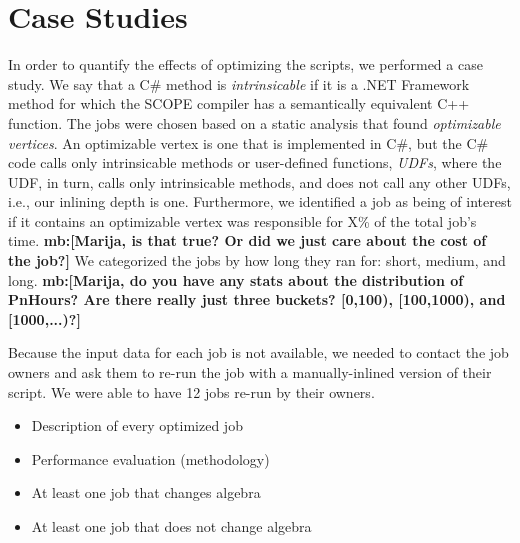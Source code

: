 \section{Case Studies}
In order to quantify the effects of optimizing the scripts, we performed a case study.
We say that a C\# method is {\em intrinsicable} if it is a .NET Framework method for which the SCOPE compiler has a semantically equivalent C++ function.
The jobs were chosen based on a static analysis that found {\em optimizable vertices}.
An optimizable vertex is one that is implemented in C\#, but the C\# code calls only intrinsicable methods or user-defined functions, {\em UDFs}, where the UDF, in turn, calls only intrinsicable methods, and does not call any other UDFs, i.e., our inlining depth is one.
Furthermore, we identified a job as being of interest if it contains an optimizable vertex was responsible for X\% of the total job's time.
{\bf mb:[Marija, is that true? Or did we just care about the cost of the job?]}
We categorized the jobs by how long they ran for: short, medium, and long.
{\bf mb:[Marija, do you have any stats about the distribution of PnHours? Are there really just three buckets? [0,100), [100,1000), and [1000,...)?]}

Because the input data for each job is not available, we needed to contact the job owners and ask them to re-run the job with a manually-inlined version of their script.
We were able to have 12 jobs re-run by their owners.

\begin{itemize}
\item Description of every optimized job
\item Performance evaluation (methodology)
\item At least one job that changes algebra
\item At least one job that does not change algebra
\end{itemize}
